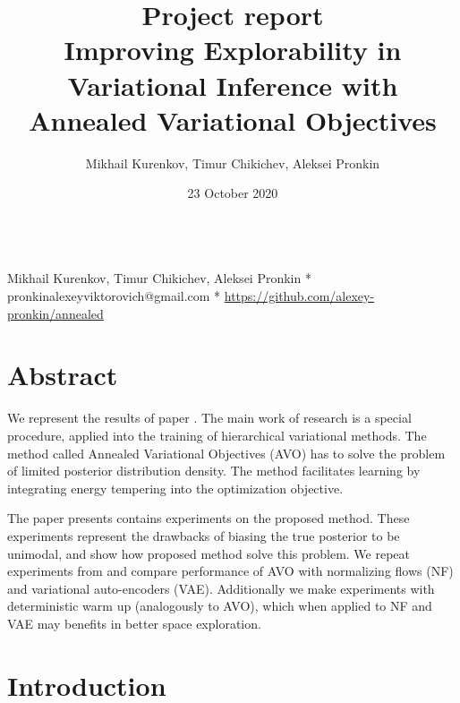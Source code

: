 \documentclass[10pt,letterpaper]{article}
\title{Project report \\ Improving Explorability in Variational Inference with Annealed Variational Objectives}
\author{Mikhail Kurenkov, Timur Chikichev, Aleksei Pronkin}
\date{23 October 2020}
\begin{document}
\vspace*{0.35in}

\begin{flushleft}
{\Large
\textbf{}
}
\newline
\\
{Mikhail Kurenkov,
Timur Chikichev,
Aleksei Pronkin}
* pronkinalexeyviktorovich@gmail.com
* \url{https://github.com/alexey-pronkin/annealed}

\end{flushleft}

\section*{Abstract}

We represent the results of paper \cite{main_Huang2018ImprovingEI}.
The main work of research is a special procedure, applied into the training of hierarchical variational methods. The method called Annealed Variational Objectives (AVO) has to solve the problem of limited posterior distribution density. The method facilitates learning by integrating energy tempering into the optimization objective.

The paper presents contains experiments on the proposed method. These experiments represent the drawbacks of biasing the true posterior to be unimodal, and show how proposed method solve this problem.
We repeat experiments from \cite{main_Huang2018ImprovingEI} and compare performance of AVO with normalizing flows (NF) and variational auto-encoders (VAE). Additionally we make experiments with deterministic warm up (analogously to AVO), which when applied to NF and VAE may benefits in better space exploration.

\linenumbers

\section*{Introduction}

\end{document}
